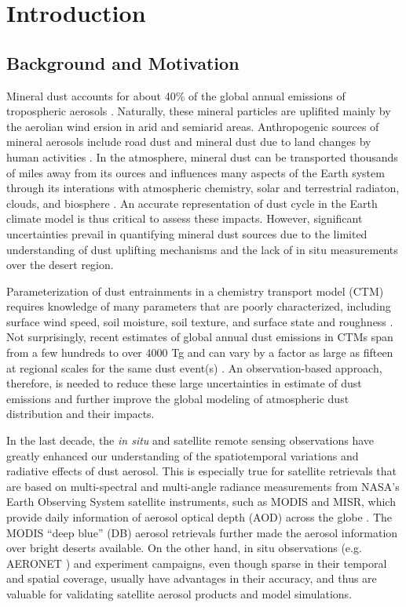 
\chapter{Introduction}

\section{Background and Motivation}

 Mineral dust accounts for about 40\% of the global annual emissions of tropospheric aerosols
 \citep{textor06,boucher13}. Naturally, these mineral 
 particles are uplifited mainly by the aerolian wind ersion in arid and semiarid areas.     
 Anthropogenic sources of mineral aerosols include road dust and mineral dust due to land 
 changes by human activities \citep{tegen96,tegen04,ginoux12}. 
 In the atmosphere, mineral dust can be transported thousands of miles away from its ources
 \citep{husar01,toon03} and influences many aspects of the Earth system through 
 its interations with atmospheric chemistry, 
 solar and terrestrial radiaton, clouds, and biosphere \citep{shao11,ravi11,satheesh05,carslaw10}. An accurate representation of dust cycle in the Earth climate model is thus critical 
 to assess these impacts. However, significant uncertainties prevail in quantifying 
 mineral dust sources due to the limited understanding of dust uplifting mechanisms and the 
 lack of in situ measurements over the desert region. 

 Parameterization of dust entrainments in a 
 chemistry transport model (CTM) requires knowledge of many parameters that are 
 poorly characterized, including surface wind speed, soil moisture, soil texture, 
 and surface state and roughness \citep{tegen94,ginoux01,zender03a}. 
 Not surprisingly, recent estimates of global annual dust emissions in CTMs 
 span from a few hundreds to over 4000 Tg \citep{huneeus11} and can vary by 
 a factor as large as fifteen at regional scales for the same dust event(s) \citep{uno06}. 
 An observation-based approach, therefore, is needed 
 to reduce these large uncertainties in estimate of 
 dust emissions and further improve the global modeling of atmospheric dust distribution 
 and their impacts.

 In the last decade, the \textit{in situ} and satellite remote sensing observations 
 have greatly enhanced our understanding of the spatiotemporal variations and 
 radiative effects of dust aerosol. 
 This is especially true for satellite retrievals that are based on 
 multi-spectral and multi-angle radiance measurements 
 from NASA’s Earth Observing System satellite instruments, such as MODIS and MISR, 
 which provide daily information of aerosol optical depth (AOD) across the globe 
 \citep{king99,kaufman02,martonchik09}. 
 The MODIS “deep blue” (DB) aerosol retrievals \citep{hsu06,hsu13} 
 further made the aerosol information over bright deserts available. 
 On the other hand, in situ observations (e.g. AERONET \citep{holben98}) 
 and experiment campaigns, even though sparse in their temporal and spatial coverage, 
 usually have advantages in their accuracy, 
 and thus are valuable for validating satellite aerosol products and model simulations.

